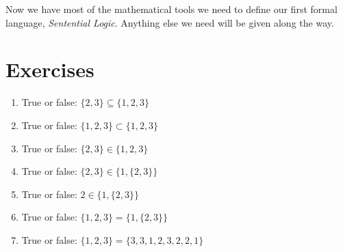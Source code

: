 Now we have most of the mathematical tools we need to define our first formal language, \emph{Sentential Logic}. Anything else we need will be given along the way.

\section{Exercises}


\begin{enumerate}
	\item True or false: $\{2, 3\}\subseteq\{1, 2, 3\}$
    \item True or false: $\{1, 2, 3\}\subset\{1, 2, 3\}$
	\item True or false: $\{2, 3\}\in\{1, 2, 3\}$
    \item True or false: $\{2, 3\}\in\{1, \{2, 3\}\}$
    \item True or false: $2\in\{1, \{2, 3\}\}$
    \item True or false: $\{1, 2, 3\}=\{1, \{2, 3\}\}$
    \item True or false: $\{1, 2, 3\}=\{3, 3, 1, 2, 3, 2, 2, 1\}$
\end{enumerate}



